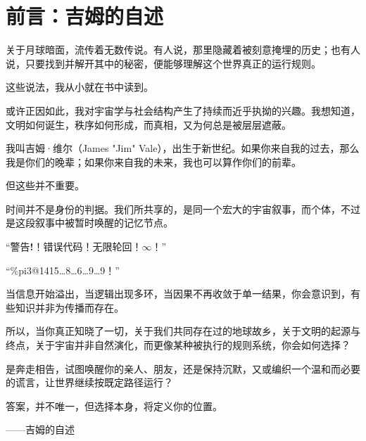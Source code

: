 \chapter*{前言：吉姆的自述}

关于月球暗面，流传着无数传说。有人说，那里隐藏着被刻意掩埋的历史；也有人说，只要找到并解开其中的秘密，便能够理解这个世界真正的运行规则。

这些说法，我从小就在书中读到。

或许正因如此，我对宇宙学与社会结构产生了持续而近乎执拗的兴趣。我想知道，文明如何诞生，秩序如何形成，而真相，又为何总是被层层遮蔽。

我叫吉姆·维尔（James "Jim" Vale），出生于新世纪。如果你来自我的过去，那么我是你们的晚辈；如果你来自我的未来，我也可以算作你们的前辈。

但这些并不重要。

时间并不是身份的判据。我们所共享的，是同一个宏大的宇宙叙事，而个体，不过是这段叙事中被暂时唤醒的记忆节点。

\SceneBreak

“警告\textbf{!}！错误代码！无限轮回！$\infty$！”

“\%pi3@1415…8…6…9…9！”

\SceneBreak

当信息开始溢出，当逻辑出现多环，当因果不再收敛于单一结果，你会意识到，有些知识并非为传播而存在。

所以，当你真正知晓了一切，关于我们共同存在过的地球故乡，关于文明的起源与终点，关于宇宙并非自然演化，而更像某种被执行的规则系统，你会如何选择？

是奔走相告，试图唤醒你的亲人、朋友，还是保持沉默，又或编织一个温和而必要的谎言，让世界继续按既定路径运行？

答案，并不唯一，但选择本身，将定义你的位置。

——吉姆的自述
